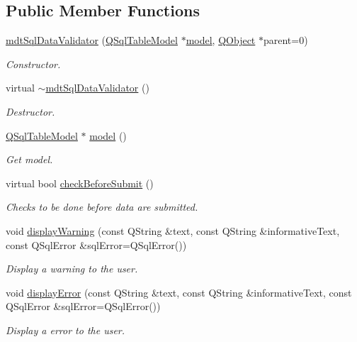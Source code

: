 \subsection*{Public Member Functions}
\begin{DoxyCompactItemize}
\item 
\hyperlink{classmdt_sql_data_validator_a609bc3f4378f092a74e47907dc3e0222}{mdt\-Sql\-Data\-Validator} (\hyperlink{class_q_sql_table_model}{Q\-Sql\-Table\-Model} $\ast$\hyperlink{classmdt_sql_data_validator_a4970687a15ac3c8099c13164fba58291}{model}, \hyperlink{class_q_object}{Q\-Object} $\ast$parent=0)
\begin{DoxyCompactList}\small\item\em Constructor. \end{DoxyCompactList}\item 
virtual \hyperlink{classmdt_sql_data_validator_a2d1348a7035ac4fcf4f4cd47a6c2fa52}{$\sim$mdt\-Sql\-Data\-Validator} ()
\begin{DoxyCompactList}\small\item\em Destructor. \end{DoxyCompactList}\item 
\hyperlink{class_q_sql_table_model}{Q\-Sql\-Table\-Model} $\ast$ \hyperlink{classmdt_sql_data_validator_a4970687a15ac3c8099c13164fba58291}{model} ()
\begin{DoxyCompactList}\small\item\em Get model. \end{DoxyCompactList}\item 
virtual bool \hyperlink{classmdt_sql_data_validator_af291c18e9c8994085ed4664db3fdcb7c}{check\-Before\-Submit} ()
\begin{DoxyCompactList}\small\item\em Checks to be done before data are submitted. \end{DoxyCompactList}\item 
void \hyperlink{classmdt_sql_data_validator_aef49b35ed8861accd9547b35aabc4ef4}{display\-Warning} (const Q\-String \&text, const Q\-String \&informative\-Text, const Q\-Sql\-Error \&sql\-Error=Q\-Sql\-Error())
\begin{DoxyCompactList}\small\item\em Display a warning to the user. \end{DoxyCompactList}\item 
void \hyperlink{classmdt_sql_data_validator_a9d21a05e4e426235c908ba16437e9554}{display\-Error} (const Q\-String \&text, const Q\-String \&informative\-Text, const Q\-Sql\-Error \&sql\-Error=Q\-Sql\-Error())
\begin{DoxyCompactList}\small\item\em Display a error to the user. \end{DoxyCompactList}\end{DoxyCompactItemize}


